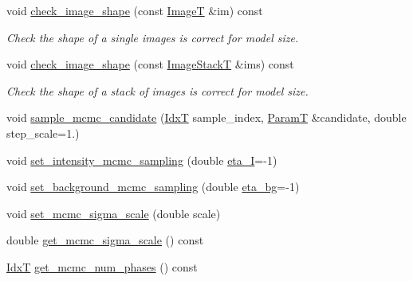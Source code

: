 \begin{DoxyCompactItemize}
\item 
void \hyperlink{classmappel_1_1ImageFormat2DBase_aa5f3936c1c0b250fa1df17d53161a991}{check\+\_\+image\+\_\+shape} (const \hyperlink{classmappel_1_1ImageFormat2DBase_a667ea5016648958e507e7db8eaa041b0}{ImageT} \&im) const 
\begin{DoxyCompactList}\small\item\em Check the shape of a single images is correct for model size. \end{DoxyCompactList}\item 
void \hyperlink{classmappel_1_1ImageFormat2DBase_ab40faca8bf94a6e59765da5c3185c19b}{check\+\_\+image\+\_\+shape} (const \hyperlink{classmappel_1_1ImageFormat2DBase_a8f0276e94ff242fa4740a718642f5e14}{Image\+StackT} \&ims) const 
\begin{DoxyCompactList}\small\item\em Check the shape of a stack of images is correct for model size. \end{DoxyCompactList}\item 
void \hyperlink{classmappel_1_1MCMCAdaptor2Ds_ab83cc9ded4235f8cfa82dbe62997dc04}{sample\+\_\+mcmc\+\_\+candidate} (\hyperlink{namespacemappel_ab17ec0f30b61ece292439d7ece81d3a8}{IdxT} sample\+\_\+index, \hyperlink{classmappel_1_1PointEmitterModel_a665ec6aea3aac139bb69a23c06d4b9a1}{ParamT} \&candidate, double step\+\_\+scale=1.)
\item 
void \hyperlink{classmappel_1_1MCMCAdaptor1D_ac70f768928859b1e9449b0ec1a141c4c}{set\+\_\+intensity\+\_\+mcmc\+\_\+sampling} (double \hyperlink{classmappel_1_1MCMCAdaptor1D_a5780d326be0c40e10d6c91777cfffbd3}{eta\+\_\+I}=-\/1)
\item 
void \hyperlink{classmappel_1_1MCMCAdaptor1D_ae79ee3845fbdd0e378f00eeebf8ccef1}{set\+\_\+background\+\_\+mcmc\+\_\+sampling} (double \hyperlink{classmappel_1_1MCMCAdaptor1D_af54c93421b8e298289cbb92743c6b3d5}{eta\+\_\+bg}=-\/1)
\item 
void \hyperlink{classmappel_1_1MCMCAdaptorBase_aa6b8eea136bf1f34f0c50bf8d1937a58}{set\+\_\+mcmc\+\_\+sigma\+\_\+scale} (double scale)
\item 
double \hyperlink{classmappel_1_1MCMCAdaptorBase_a9de5ee52bbf5c8fd3c1e3bd00836801a}{get\+\_\+mcmc\+\_\+sigma\+\_\+scale} () const 
\item 
\hyperlink{namespacemappel_ab17ec0f30b61ece292439d7ece81d3a8}{IdxT} \hyperlink{classmappel_1_1MCMCAdaptorBase_adb9997f1dc774f3a169c61cdb730a85f}{get\+\_\+mcmc\+\_\+num\+\_\+phases} () const 
\end{DoxyCompactItemize}
